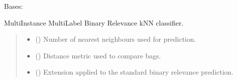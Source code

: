 \documentclass[letterpaper,10pt,english]{sphinxmanual}
\begin{document}
\begin{fulllineitems}
\label{\detokenize{classifier/lazy/index:miml.classifier.miml.lazy.miml_br_knn.MIMLBRkNN}}
\pysigstartsignatures
\pysiglinewithargsret
{}
{\sphinxparamcomma {}\sphinxparamcomma {}}
{}
\pysigstopsignatures
\sphinxAtStartPar
Bases: {\hyperref[\detokenize{classifier/lazy/index:miml.classifier.miml.lazy.multi_instance_multi_label_knn.MultiInstanceMultiLabelKNN}]{}}

\sphinxAtStartPar
Multi\sphinxhyphen{}Instance Multi\sphinxhyphen{}Label Binary Relevance kNN classifier.
\begin{quote}\begin{description}
\begin{itemize}
\item {} 
\sphinxAtStartPar
{} (\sphinxstyleliteralemphasis{\sphinxupquote{, }}) \textendash{} Number of nearest neighbours used for prediction.

\item {} 
\sphinxAtStartPar
{} ({\hyperref[\detokenize{core/index:miml.core.hausdorff_distance.HausdorffDistance}]{}}\sphinxstyleliteralemphasis{\sphinxupquote{, }}) \textendash{} Distance metric used to compare bags.

\item {} 
\sphinxAtStartPar
{} (\sphinxstyleliteralemphasis{\sphinxupquote{, }}) \textendash{} Extension applied to the standard binary relevance prediction.

\end{itemize}


\end{description}
\end{quote}
\end{fulllineitems}
\end{document}
